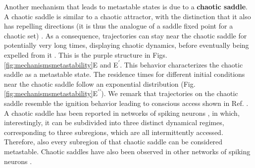 \documentclass[reprint,superscriptaddress,showpacs,amsmath,amssymb,aps,floatfix,nolongbibliography]{revtex4-2}
\theoremstyle{definition}
\newcommand{\Emph}[1]{\textbf{#1}}
\newcommand*{\supprime}{\textsuperscript{\everymodeprime}\xspace}
\newcommand*{\ssupprime}{\textsuperscript{\everymodeprime\everymodeprime\xspace}}
\newcommand*{\everymodeprime}{\ensuremath{\prime}}
\begin{document}
Another mechanism that leads to metastable states is due to a \Emph{chaotic saddle}. A chaotic saddle is similar to a chaotic attractor, with the distinction that it also has repelling directions (it is thus the analogue of a saddle fixed point for a chaotic set) \cite{lai2009transient}. As a consequence, trajectories can stay near the chaotic saddle for potentially very long times, displaying chaotic dynamics, before eventually being expelled from it \cite{yorke1979metastable}. This is the purple structure in Figs. \ref{fig:mechanismsmetastability}E and E\supprime. This behavior characterizes the chaotic saddle as a metastable state. The residence times for different initial conditions near the chaotic saddle follow an exponential distribution \cite{grebogi1983crises} (Fig. \ref{fig:mechanismsmetastability}E\ssupprime). We remark that trajectories on the chaotic saddle resemble the ignition behavior leading to conscious access shown in Ref. \cite{dehaene2005ongoing}.
A chaotic saddle has been reported in networks of spiking neurons \cite{ansmann2016selfinduced}, in which, interestingly, it can be subdivided into three distinct dynamical regimes, corresponding to three subregions, which are all intermittently accessed. Therefore, also every subregion of that chaotic saddle can be considered metastable. Chaotic saddles have also been observed in other networks of spiking neurons \cite{keplinger2014transient, lafranceschina2015impact, hartle2017transient, kaminker2019alternating}.
\end{document}

